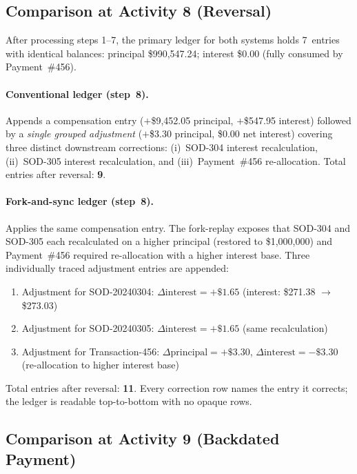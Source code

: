\documentclass[11pt,letterpaper]{article}
\begin{document}
\subsection{Comparison at Activity 8 (Reversal)}

After processing steps 1--7, the primary ledger for both systems holds
7~entries with identical balances: principal \$990,547.24; interest
\$0.00 (fully consumed by Payment~\#456).

\paragraph{Conventional ledger (step~8).}
Appends a compensation entry ($+$\$9,452.05 principal,
$+$\$547.95 interest) followed by a \emph{single grouped adjustment}
($+$\$3.30 principal, \$0.00 net interest) covering three distinct
downstream corrections: (i)~SOD-304 interest recalculation,
(ii)~SOD-305 interest recalculation, and (iii)~Payment~\#456
re-allocation. Total entries after reversal: \textbf{9}.

\paragraph{Fork-and-sync ledger (step~8).}
Applies the same compensation entry. The fork-replay exposes that
SOD-304 and SOD-305 each recalculated on a higher principal (restored
to \$1,000,000) and Payment~\#456 required re-allocation with a higher
interest base. Three individually traced adjustment entries are
appended:
\begin{enumerate}
  \item Adjustment for SOD-20240304: $\Delta\text{interest} = +\$1.65$
        (interest: \$271.38 $\to$ \$273.03)
  \item Adjustment for SOD-20240305: $\Delta\text{interest} = +\$1.65$
        (same recalculation)
  \item Adjustment for Transaction-456: $\Delta\text{principal} = +\$3.30$,
        $\Delta\text{interest} = -\$3.30$ (re-allocation to higher
        interest base)
\end{enumerate}
Total entries after reversal: \textbf{11}. Every correction row names
the entry it corrects; the ledger is readable top-to-bottom with no
opaque rows.

\subsection{Comparison at Activity 9 (Backdated Payment)}
\end{document}

